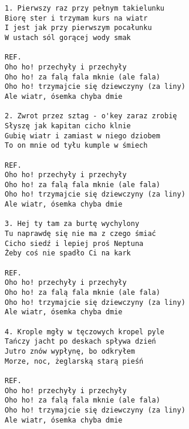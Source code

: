 \documentclass[12pt]{article}
\begin{document}
\begin{verbatim}
1. Pierwszy raz przy pełnym takielunku
Biorę ster i trzymam kurs na wiatr
I jest jak przy pierwszym pocałunku
W ustach sól gorącej wody smak

REF.
Oho ho! przechyły i przechyły
Oho ho! za falą fala mknie (ale fala)
Oho ho! trzymajcie się dziewczyny (za liny)
Ale wiatr, ósemka chyba dmie

2. Zwrot przez sztag - o'key zaraz zrobię
Słyszę jak kapitan cicho klnie
Gubię wiatr i zamiast w niego dziobem
To on mnie od tyłu kumple w śmiech

REF.
Oho ho! przechyły i przechyły
Oho ho! za falą fala mknie (ale fala)
Oho ho! trzymajcie się dziewczyny (za liny)
Ale wiatr, ósemka chyba dmie

3. Hej ty tam za burtę wychylony
Tu naprawdę się nie ma z czego śmiać
Cicho siedź i lepiej proś Neptuna
Żeby coś nie spadło Ci na kark

REF.
Oho ho! przechyły i przechyły
Oho ho! za falą fala mknie (ale fala)
Oho ho! trzymajcie się dziewczyny (za liny)
Ale wiatr, ósemka chyba dmie

4. Krople mgły w tęczowych kropel pyle
Tańczy jacht po deskach spływa dzień
Jutro znów wypłynę, bo odkryłem
Morze, noc, żeglarską starą pieśń

REF.
Oho ho! przechyły i przechyły
Oho ho! za falą fala mknie (ale fala)
Oho ho! trzymajcie się dziewczyny (za liny)
Ale wiatr, ósemka chyba dmie
\end{verbatim}
\clearpage
\end{document}
